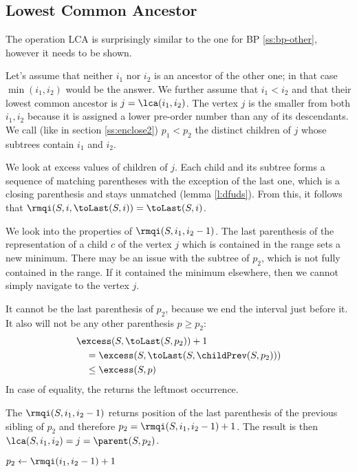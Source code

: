 \subsection{Lowest Common Ancestor}

The operation LCA is surprisingly similar to the one for BP \ref{ss:bp-other}, however it needs to be shown.

Let's assume that neither $i_1$ nor $i_2$ is an ancestor of the other one; in that case $\min(i_1, i_2)$ would be the answer.
We further assume that $i_1 < i_2$ and that their lowest common ancestor is $j = \lca(i_1, i_2)$.
The vertex $j$ is the smaller from both $i_1, i_2$ because it is assigned a lower pre-order number than any of its descendants.
We call (like in section \ref{ss:enclose2}) $p_1 < p_2$ the distinct children of $j$ whose subtrees contain $i_1$ and $i_2$.

We look at excess values of children of $j$.
Each child and its subtree forms a sequence of matching parentheses with the exception of the last one, which is a closing parenthesis and stays unmatched (lemma \ref{l:dfuds}).
From this, it follows that $\rmqi(S, i, \toLast(S, i)) = \toLast(S, i)$.

We look into the properties of $\rmqi(S, i_1, i_2 - 1)$.
The last parenthesis of the representation of a child $c$ of the vertex $j$ which is contained in the range sets a new minimum.
There may be an issue with the subtree of $p_2$, which is not fully contained in the range.
If it contained the minimum elsewhere, then we cannot simply navigate to the vertex $j$.

It cannot be the last parenthesis of $p_2$, because we end the interval just before it.
It also will not be any other parenthesis $p \ge p_2$:
\begin{align*}
	& \excess(S, \toLast(S, p_2)) + 1 \\
	&\quad = \excess(S, \toLast(S, \childPrev(S, p_2))) \\
	&\quad \le \excess(S, p)
\end{align*}
In case of equality, the \rmqi{} returns the leftmost occurrence.

The $\rmqi(S, i_1, i_2 - 1)$ returns position of the last parenthesis of the previous sibling of $p_2$ and therefore $p_2 = \rmqi(S, i_1, i_2 - 1) + 1$.
The result is then $\lca(S, i_1, i_2) = j = \parent(S, p_2)$.

\begin{algorithm}
\begin{algorithmic}
		\State {}
		\State {}
	\Else
		\State $p_2 \gets \rmqi(i_1, i_2 - 1) + 1$
		\State {}
	\EndIf
\EndFunction
\end{algorithmic}
\end{algorithm}


